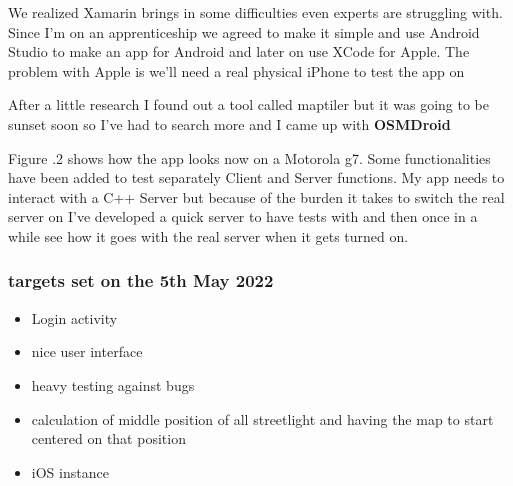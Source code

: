 \documentclass[a4paper,12pt]{article}
\begin{document}
\noindent We realized Xamarin brings in some difficulties even experts are struggling with. Since I'm on an apprenticeship we agreed to make it simple and use Android Studio to make an app for Android and later on use XCode for Apple. The problem with Apple is we'll need a real physical iPhone to test the app on

After a little research I found out a tool called maptiler but it was going to be sunset soon so I've had to search more and I came up with \textbf{OSMDroid}

Figure .2 shows how the app looks now on a Motorola g7. Some functionalities have been added to test separately Client and Server functions. My app needs to interact with a C++ Server but because of the burden it takes to switch the real server on I've developed a quick server to have tests with and then once in a while see how it goes with the real server when it gets turned on.

\subsubsection{targets set on the 5th May 2022}

\begin{itemize}
\item{Login activity}
\item{nice user interface}
\item{heavy testing against bugs}
\item{calculation of middle position of all streetlight and having the map to start centered on that position}
\item{iOS instance}
\end{itemize}

\clearpage
\end{document}
